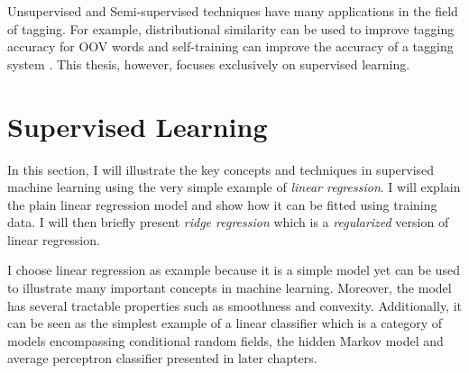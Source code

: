 Unsupervised and Semi-supervised techniques have many applications in
the field of tagging. For example, distributional similarity can be
used to improve tagging accuracy for OOV words
\citep{Huang2009a,Ostling2013} and self-training can improve the
accuracy of a tagging system \citep{Spoustova2009,Sogaard2011}.  This
thesis, however, focuses exclusively on supervised learning.

\section{Supervised Learning}

In this section, I will illustrate the key concepts and techniques in
supervised machine learning using the very simple example of {\it
  linear regression}. I will explain the plain linear regression model
and show how it can be fitted using training data. I will then briefly
present {\it ridge regression} which is a {\it regularized} version of
linear regression.

I choose linear regression as example because it is a simple model yet
can be used to illustrate many important concepts in machine
learning. Moreover, the model has several tractable properties such as
smoothness and convexity. Additionally, it can be seen as the simplest
example of a linear classifier which is a category of models
encompassing conditional random fields, the hidden Markov model and
average perceptron classifier presented in later chapters.

